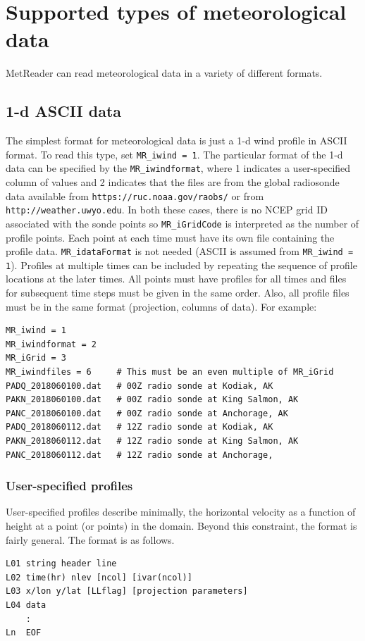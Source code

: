 \documentclass[11pt]{article}   %
\begin{document}
\section{Supported types of meteorological data}
MetReader can read meteorological data in a variety of different formats.  
\subsection{1-d ASCII data}
The simplest format for meteorological data is just a 1-d wind profile in ASCII
format.  To read this type, set \texttt{MR\_iwind = 1}.  The particular format
of the 1-d data can be specified by the \texttt{MR\_iwindformat}, where 1 indicates a
user-specified column of values and 2 indicates that the files are from 
the global radiosonde data available from \texttt{https://ruc.noaa.gov/raobs/} or
from \texttt{http://weather.uwyo.edu}.
In both these cases, there is no NCEP grid ID associated with the sonde points so
\texttt{MR\_iGridCode} is interpreted as the number of profile points.  Each point at each
time must have its own file containing the profile data.
\texttt{MR\_idataFormat} is not needed (ASCII is assumed from \texttt{MR\_iwind = 1}).
Profiles at multiple times can be included by repeating the sequence of profile
locations at the later times.  All points must have profiles for all times and files
for subsequent time steps must be given in the same order.
Also, all profile files must be in the same format (projection, columns of data).
For example:

\begin{verbatim}
MR_iwind = 1
MR_iwindformat = 2
MR_iGrid = 3
MR_iwindfiles = 6     # This must be an even multiple of MR_iGrid
PADQ_2018060100.dat   # 00Z radio sonde at Kodiak, AK
PAKN_2018060100.dat   # 00Z radio sonde at King Salmon, AK
PANC_2018060100.dat   # 00Z radio sonde at Anchorage, AK
PADQ_2018060112.dat   # 12Z radio sonde at Kodiak, AK
PAKN_2018060112.dat   # 12Z radio sonde at King Salmon, AK
PANC_2018060112.dat   # 12Z radio sonde at Anchorage, 
\end{verbatim}

\subsubsection{User-specified profiles}
User-specified profiles describe minimally, the horizontal velocity as a function
of height at a point (or points) in the domain.  Beyond this constraint,
the format is fairly
general.  The format is as follows.
\begin{verbatim}
L01 string header line
L02 time(hr) nlev [ncol] [ivar(ncol)]
L03 x/lon y/lat [LLflag] [projection parameters]
L04 data
    :
Ln  EOF
\end{verbatim}
\end{document}
